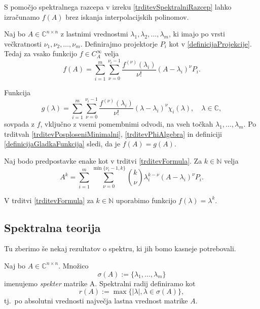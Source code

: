 \documentclass[mat1]{fmfdelo}
\newcommand{\N}{\mathbb N}
\newcommand{\C}{\mathbb C}
\begin{document}
S pomočjo spektralnega razcepa v izreku \ref{trditevSpektralniRazcep} lahko izračunamo $f(A)$ brez iskanja interpolacijskih polinomov.
\begin{izrek} \label{trditevFormula}
    Naj bo $A \in \C^{n \times n}$ z lastnimi vrednostmi $\lambda_1, \lambda_2, \ldots, \lambda_m$, ki imajo po vrsti večkratnosti $\nu_1, \nu_2, \ldots, \nu_m$. Definirajmo projektorje $P_i$ kot v \eqref{definicijaProjekcije}. Tedaj za vsako funkcijo $f \in C_A^\infty$ velja
    \begin{equation*}
        f(A) = \sum_{i=1}^m \sum_{\nu = 0}^{\nu_i - 1} \frac{f^{(\nu)}(\lambda_i)}{\nu !}(A - \lambda_i)^\nu P_i.
    \end{equation*}
\end{izrek}
\begin{dokaz}
    Funkcija
    \begin{equation*}
        g(\lambda) = \sum_{i=1}^m \sum_{\nu = 0}^{\nu_i - 1} \frac{f^{(\nu)}(\lambda_i)}{\nu !}(\lambda - \lambda_i)^\nu \chi_i(\lambda), \quad \lambda \in \C,
    \end{equation*}
    sovpada z $f$, vključno z vsemi pomembnimi odvodi, na vseh točkah $\lambda_1, \ldots, \lambda_m$.  Po trditvah \ref{trditevPosploseniMinimalni}, \ref{trditevPhiAlgebra} in definiciji \ref{definicijaGladkaFunkcija} sledi, da je $f(A) = g(A)$.
\end{dokaz}
\begin{posledica}
    Naj bodo predpostavke enake kot v trditvi \ref{trditevFormula}. Za $k \in \N$ velja
    \begin{equation}\label{formulaMatricnePotence}
        A^k = \sum_{i=1}^m \sum_{\nu = 0}^{\min \{\nu_i - 1, k\}} {k \choose \nu} \lambda_i^{k-\nu}(A - \lambda_i)^\nu P_i.
    \end{equation}
\end{posledica}
\begin{dokaz}
    V trditvi \ref{trditevFormula} za $k \in \N$ uporabimo funkcijo $f(\lambda) = \lambda^k$.
\end{dokaz}

\subsection{Spektralna teorija}
Tu zberimo še nekaj rezultatov o spektru, ki jih bomo kasneje potrebovali.
\begin{definicija}
    Naj bo $A \in \C^{n \times n}$. Množico
    \begin{equation*}
        \sigma(A) := \{\lambda_1, \ldots, \lambda_m\}
    \end{equation*}
    imenujemo \emph{spekter} matrike A. {Spektralni radij} definiramo kot
    \begin{equation*}
        r(A) := \max \{|\lambda|, \lambda \in \sigma(A)\},
    \end{equation*}
    tj.\ po absolutni vrednosti največja lastna vrednost matrike $A$.
\end{definicija}
\end{document}
